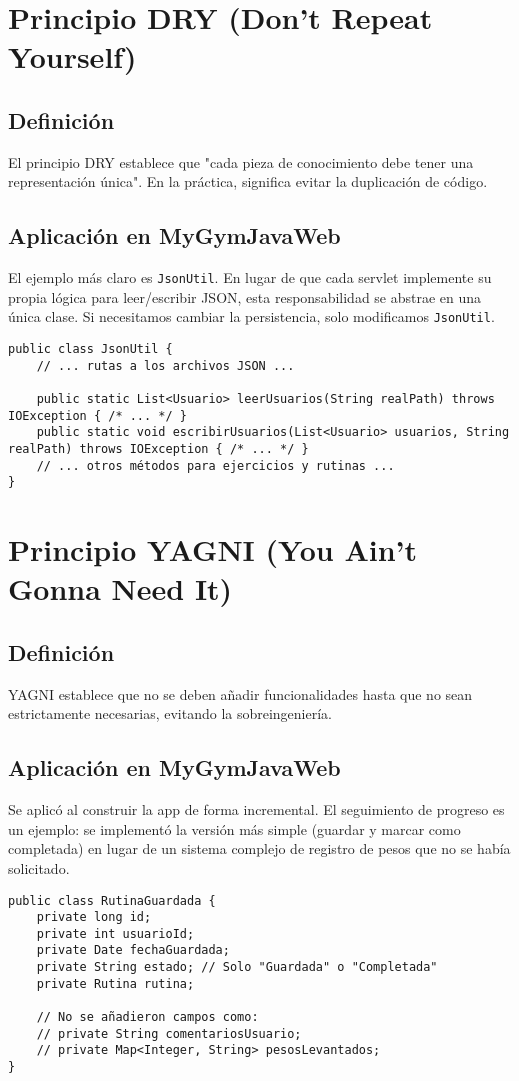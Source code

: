 \documentclass[11pt,a4paper]{article}
\begin{document}
\section{Principio DRY (Don't Repeat Yourself)}
\subsection{Definición}
El principio DRY establece que "cada pieza de conocimiento debe tener una representación única". En la práctica, significa evitar la duplicación de código.
\subsection{Aplicación en MyGymJavaWeb}
El ejemplo más claro es \texttt{JsonUtil}. En lugar de que cada servlet implemente su propia lógica para leer/escribir JSON, esta responsabilidad se abstrae en una única clase. Si necesitamos cambiar la persistencia, solo modificamos \texttt{JsonUtil}.
\begin{lstlisting}[caption={Centralización de la lógica de persistencia en \texttt{JsonUtil.java}}]
public class JsonUtil {
    // ... rutas a los archivos JSON ...

    public static List<Usuario> leerUsuarios(String realPath) throws IOException { /* ... */ }
    public static void escribirUsuarios(List<Usuario> usuarios, String realPath) throws IOException { /* ... */ }
    // ... otros métodos para ejercicios y rutinas ...
}
\end{lstlisting}

\section{Principio YAGNI (You Ain't Gonna Need It)}
\subsection{Definición}
YAGNI establece que no se deben añadir funcionalidades hasta que no sean estrictamente necesarias, evitando la sobreingeniería.
\subsection{Aplicación en MyGymJavaWeb}
Se aplicó al construir la app de forma incremental. El seguimiento de progreso es un ejemplo: se implementó la versión más simple (guardar y marcar como completada) en lugar de un sistema complejo de registro de pesos que no se había solicitado.
\begin{lstlisting}[caption={Modelo de datos simple en \texttt{RutinaGuardada.java} siguiendo YAGNI}]
public class RutinaGuardada {
    private long id;
    private int usuarioId;
    private Date fechaGuardada;
    private String estado; // Solo "Guardada" o "Completada"
    private Rutina rutina;

    // No se añadieron campos como:
    // private String comentariosUsuario;
    // private Map<Integer, String> pesosLevantados;
}
\end{lstlisting}
\end{document}
